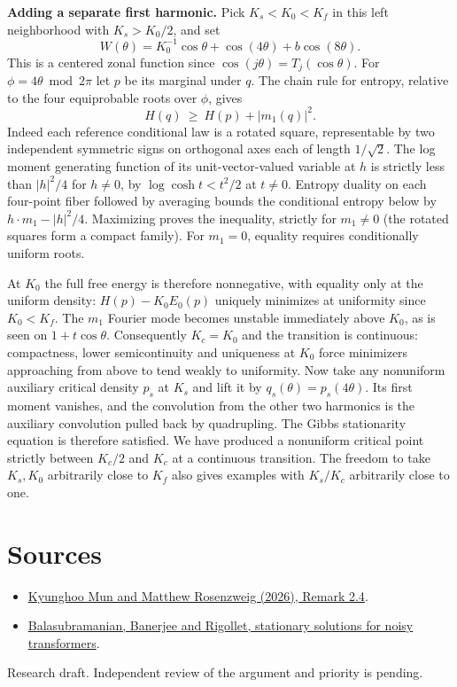 \documentclass[11pt]{article}
\begin{document}
\textbf{Adding a separate first harmonic.} Pick $K_s<K_0<K_f$ in this left neighborhood with $K_s>K_0/2$, and set
\[
 W(\theta)=K_0^{-1}\cos\theta+\cos(4\theta)+b\cos(8\theta).
\]
This is a centered zonal function since $\cos(j\theta)=T_j(\cos\theta)$. For $\phi=4\theta\bmod 2\pi$ let $p$ be its marginal under $q$. The chain rule for entropy, relative to the four equiprobable roots over $\phi$, gives
\[
 H(q)\ \ge\ H(p)+|m_1(q)|^2.
\]
Indeed each reference conditional law is a rotated square, representable by two independent symmetric signs on orthogonal axes each of length $1/\sqrt2$. The log moment generating function of its unit-vector-valued variable at $h$ is strictly less than $|h|^2/4$ for $h\ne0$, by $\log\cosh t<t^2/2$ at $t\ne0$. Entropy duality on each four-point fiber followed by averaging bounds the conditional entropy below by $h\cdot m_1-|h|^2/4$. Maximizing proves the inequality, strictly for $m_1\ne0$ (the rotated squares form a compact family). For $m_1=0$, equality requires conditionally uniform roots.

At $K_0$ the full free energy is therefore nonnegative, with equality only at the uniform density: $H(p)-K_0E_0(p)$ uniquely minimizes at uniformity since $K_0<K_f$. The $m_1$ Fourier mode becomes unstable immediately above $K_0$, as is seen on $1+t\cos\theta$. Consequently $K_c=K_0$ and the transition is continuous: compactness, lower semicontinuity and uniqueness at $K_0$ force minimizers approaching from above to tend weakly to uniformity. Now take any nonuniform auxiliary critical density $p_s$ at $K_s$ and lift it by $q_s(\theta)=p_s(4\theta)$. Its first moment vanishes, and the convolution from the other two harmonics is the auxiliary convolution pulled back by quadrupling. The Gibbs stationarity equation is therefore satisfied. We have produced a nonuniform critical point strictly between $K_c/2$ and $K_c$ at a continuous transition. The freedom to take $K_s,K_0$ arbitrarily close to $K_f$ also gives examples with $K_s/K_c$ arbitrarily close to one.

\section*{Sources}
\begin{itemize}\setlength{\itemsep}{0pt}\setlength{\parskip}{0pt}
\item \href{https://arxiv.org/abs/2606.05140}{Kyunghoo Mun and Matthew Rosenzweig (2026), Remark 2.4}.
\item \href{https://arxiv.org/abs/2510.20094}{Balasubramanian, Banerjee and Rigollet, stationary solutions for noisy transformers}.
\end{itemize}
{\small Research draft. Independent review of the argument and priority is pending.}
\end{document}
